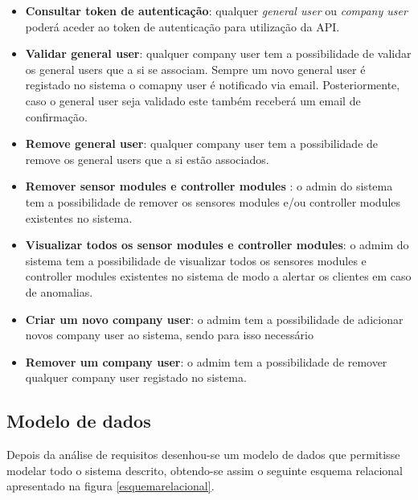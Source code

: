 \begin{itemize}
	\item \textbf{Consultar token de autenticação}: qualquer \textit{general user} ou \textit{company user} poderá aceder ao token de autenticação para utilização da API. 
	

	
	\item \textbf{Validar general user}: qualquer company user tem a possibilidade de validar os general users que a si se associam. Sempre um novo general user é registado no sistema o comapny user é notificado via email. Posteriormente, caso o general user seja validado este também receberá um email de confirmação.  
	
	\item \textbf{Remove general user}: qualquer company user tem a possibilidade de remove os general users que a si estão associados. 
	
	
	\item \textbf{Remover sensor modules e controller modules }: o admin do sistema tem a possibilidade de remover os sensores modules e/ou controller modules existentes no sistema. 
	
	
	\item \textbf{Visualizar todos os sensor modules e controller modules}: o admim do sistema tem a possibilidade de visualizar todos os sensores modules e controller modules existentes no sistema de modo a alertar os clientes em caso de anomalias. 
	
	
	\item \textbf{Criar um novo company user}: o admim tem a possibilidade de adicionar novos company user ao sistema, sendo para isso necessário 
	
	\item \textbf{Remover um company user}: o admim tem a possibilidade de remover qualquer company user registado no sistema.
	
	
\end{itemize}









\newpage
\subsection{Modelo de dados}

Depois da análise de requisitos desenhou-se um modelo de dados que permitisse modelar todo o sistema descrito, obtendo-se assim o seguinte esquema relacional apresentado na figura \ref{esquemarelacional}.





